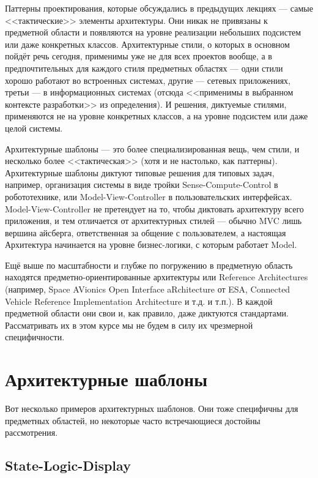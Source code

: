 \documentclass{../../text-style}
\begin{document}
Паттерны проектирования, которые обсуждались в предыдущих лекциях --- самые <<тактические>> элементы архитектуры. Они никак не привязаны к предметной области и появляются на уровне реализации небольших подсистем или даже конкретных классов. Архитектурные стили, о которых в основном пойдёт речь сегодня, применимы уже не для всех проектов вообще, а в предпочтительных для каждого стиля предметных областях --- одни стили хорошо работают во встроенных системах, другие --- сетевых приложениях, третьи --- в информационных системах (отсюда <<применимы в выбранном контексте разработки>> из определения). И решения, диктуемые стилями, применяются не на уровне конкретных классов, а на уровне подсистем или даже целой системы.

Архитектурные шаблоны --- это более специализированная вещь, чем стили, и несколько более <<тактическая>> (хотя и не настолько, как паттерны). Архитектурные шаблоны диктуют типовые решения для типовых задач, например, организация системы в виде тройки Sense-Compute-Control в робототехнике, или Model-View-Controller в пользовательских интерфейсах. Model-View-Controller не претендует на то, чтобы диктовать архитектуру всего приложения, и тем отличается от архитектурных стилей --- обычно MVC лишь вершина айсберга, ответственная за общение с пользователем, а настоящая Архитектура начинается на уровне бизнес-логики, с которым работает Model.

Ещё выше по масштабности и глубже по погружению в предметную область находятся предметно-ориентированные архитектуры или Reference Architectures (например, Space AVionics Open Interface aRchitecture от ESA, Connected Vehicle Reference Implementation Architecture и т.д. и т.п.). В каждой предметной области они свои и, как правило, даже диктуются стандартами. Рассматривать их в этом курсе мы не будем в силу их чрезмерной специфичности.

\section{Архитектурные шаблоны}

Вот несколько примеров архитектурных шаблонов. Они тоже специфичны для предметных областей, но некоторые часто встречающиеся достойны рассмотрения.

\subsection{State-Logic-Display}
\end{document}
